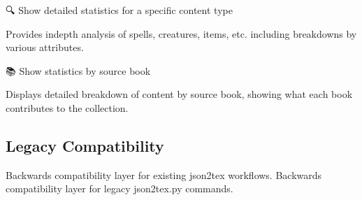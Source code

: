 \documentclass[letterpaper,10pt,english]{sphinxmanual}
\begin{document}
\begin{fulllineitems}
\label{\detokenize{api/cli:src.cli.commands.stats.show_content_stats}}
\pysigstartsignatures
\pysiglinewithargsret
{}
{}
{}
\pysigstopsignatures
\sphinxAtStartPar
🔍 Show detailed statistics for a specific content type

\sphinxAtStartPar
Provides in\sphinxhyphen{}depth analysis of spells, creatures, items, etc.
including breakdowns by various attributes.

\end{fulllineitems}


\begin{fulllineitems}
\label{\detokenize{api/cli:src.cli.commands.stats.show_source_stats}}
\pysigstartsignatures
\pysiglinewithargsret
{}
{}
{}
\pysigstopsignatures
\sphinxAtStartPar
📚 Show statistics by source book

\sphinxAtStartPar
Displays detailed breakdown of content by source book,
showing what each book contributes to the collection.

\end{fulllineitems}



\subsection{Legacy Compatibility}
\label{\detokenize{api/cli:legacy-compatibility}}
\sphinxAtStartPar
Backwards compatibility layer for existing json2tex workflows.
\label{\detokenize{api/cli:module-src.cli.compat}}
\sphinxAtStartPar
Backwards compatibility layer for legacy json2tex.py commands.
\end{document}
